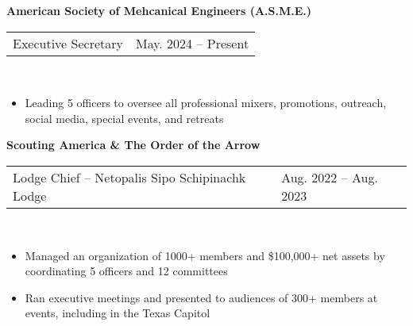 \documentclass[18pt]{article}
\begin{document}
\textbf{American Society of Mehcanical Engineers (A.S.M.E.)}

\begin{tabular}{p{} p{}}
    Executive Secretary &
    \hfill May. 2024 – Present
\end{tabular}\\

\vspace{-0.5\baselineskip}
\begin{itemize}[noitemsep]
    \vspace{-\baselineskip}
        
    \item Leading 5 officers to oversee all professional mixers, promotions, outreach, social media, special events, and retreats
\end{itemize}

\vspace{-0.5\baselineskip}

\textbf{Scouting America \& The Order of the Arrow}\\

\vspace{-\baselineskip}
\begin{tabular}{p{} p{}}
    Lodge Chief – Netopalis Sipo Schipinachk Lodge
    &\hfill Aug. 2022 – Aug. 2023
\end{tabular}\\

\vspace{-0.5\baselineskip}
\begin{itemize}[noitemsep]
  \vspace{-\baselineskip}
  \item Managed an organization of 1000+ members and \$100,000+ net assets by coordinating 5 officers and 12 committees
  \item Ran executive meetings and presented to audiences of 300+ members at events, including in the Texas Capitol 
  \vspace{-0.5\baselineskip}
\end{itemize}



  
\end{document}
